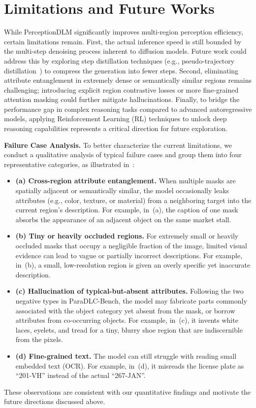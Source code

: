 \section{Limitations and Future Works}
\label{sec:limitation}
While PerceptionDLM significantly improves multi-region perception efficiency, certain limitations remain. First, the actual inference speed is still bounded by the multi-step denoising process inherent to diffusion models. Future work could address this by exploring step distillation techniques (e.g., pseudo-trajectory distillation~\citep{qian2026d3llm}) to compress the generation into fewer steps. Second, eliminating attribute entanglement in extremely dense or semantically similar regions remains challenging; introducing explicit region contrastive losses or more fine-grained attention masking could further mitigate hallucinations. Finally, to bridge the performance gap in complex reasoning tasks compared to advanced autoregressive models, applying Reinforcement Learning (RL) techniques to unlock deep reasoning capabilities represents a critical direction for future exploration.

\noindent
\textbf{Failure Case Analysis.}
To better characterize the current limitations, we conduct a qualitative analysis of typical failure cases and group them into four representative categories, as illustrated in~:
\begin{itemize}
    \item \textbf{(a) Cross-region attribute entanglement.} When multiple masks are spatially adjacent or semantically similar, the model occasionally leaks attributes (e.g., color, texture, or material) from a neighboring target into the current region's description. For example, in~(a), the caption of one mask absorbs the appearance of an adjacent object on the same market stall.
    \item \textbf{(b) Tiny or heavily occluded regions.} For extremely small or heavily occluded masks that occupy a negligible fraction of the image, limited visual evidence can lead to vague or partially incorrect descriptions. For example, in~(b), a small, low-resolution region is given an overly specific yet inaccurate description.
    \item \textbf{(c) Hallucination of typical-but-absent attributes.} Following the two negative types in ParaDLC-Bench, the model may fabricate parts commonly associated with the object category yet absent from the mask, or borrow attributes from co-occurring objects. For example, in~(c), it invents white laces, eyelets, and tread for a tiny, blurry shoe region that are indiscernible from the pixels.
    \item \textbf{(d) Fine-grained text.} The model can still struggle with reading small embedded text (OCR). For example, in~(d), it misreads the license plate as ``201-VH'' instead of the actual ``267-JAN''.
\end{itemize}
These observations are consistent with our quantitative findings and motivate the future directions discussed above.

